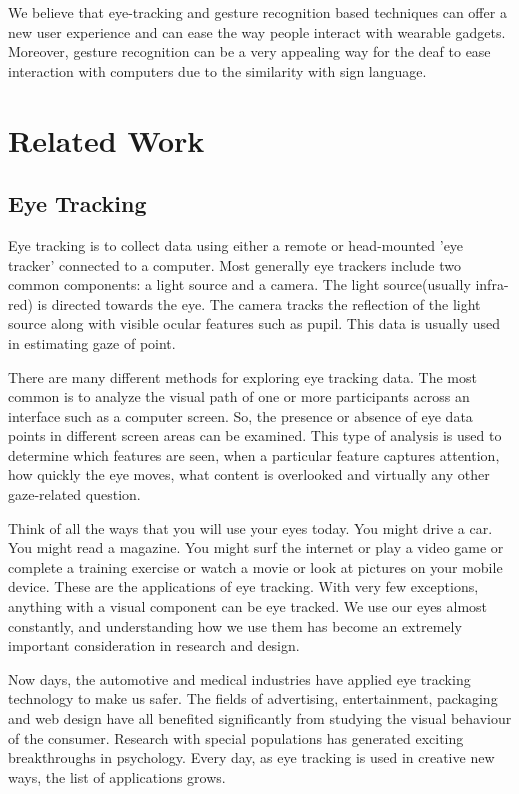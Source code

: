 We believe that eye-tracking and gesture recognition based techniques can offer a new user experience and can ease the way people interact with wearable gadgets. Moreover, gesture recognition can be a very appealing way for the deaf to ease interaction with computers due to the similarity with sign language. 


\section{Related Work}
\subsection{Eye Tracking} 
Eye tracking is to collect data using either a remote or head-mounted 'eye tracker' connected to a computer. Most generally eye trackers include two common components: a light source and a camera. The light source(usually infra-red) is directed towards the eye. The camera tracks the reflection of the light source along with visible ocular features such as pupil. This data is usually used in estimating gaze of point. \bigskip

There are many different methods for exploring eye tracking data. The most common is to analyze the visual path of one or more participants across an interface such as a computer screen. So, the presence or absence of eye data points in different screen areas can be examined. This type of analysis is used to determine which features are seen, when a particular feature captures attention, how quickly the eye moves, what content is overlooked and virtually any other gaze-related question. \bigskip

Think of all the ways that you will use your eyes today. You might drive a car. You might read a magazine. You might surf the internet or play a video game or complete a training exercise or watch a movie or look at pictures on your mobile device. These are the applications of eye tracking. With very few exceptions, anything with a visual component can be eye tracked. We use our eyes almost constantly, and understanding how we use them has become an extremely important consideration in research and design. \bigskip

Now days, the automotive and medical industries have applied eye tracking technology to make us safer. The fields of advertising, entertainment, packaging and web design have all benefited significantly from studying the visual behaviour of the consumer. Research with special populations has generated exciting breakthroughs in psychology. Every day, as eye tracking is used in creative new ways, the list of applications grows. \bigskip

